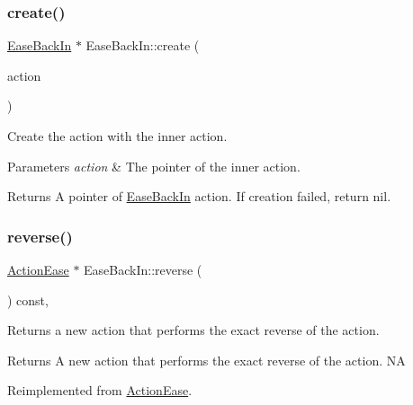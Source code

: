 \subsubsection{\texorpdfstring{create()}{create()}}
{\footnotesize\ttfamily \hyperlink{classEaseBackIn}{Ease\+Back\+In} $\ast$ Ease\+Back\+In\+::create (\begin{DoxyParamCaption}\item[{\hyperlink{classActionInterval}{Action\+Interval} $\ast$}]{action }\end{DoxyParamCaption})\hspace{0.3cm}{\ttfamily [static]}}



Create the action with the inner action. 


\begin{DoxyParams}{Parameters}
{\em action} & The pointer of the inner action. \\
\hline
\end{DoxyParams}
\begin{DoxyReturn}{Returns}
A pointer of \hyperlink{classEaseBackIn}{Ease\+Back\+In} action. If creation failed, return nil. 
\end{DoxyReturn}
\mbox{\label{classEaseBackIn_a79ac3292fef1c39370c668b99372b256}} 
\subsubsection{\texorpdfstring{reverse()}{reverse()}}
{\footnotesize\ttfamily \hyperlink{classActionEase}{Action\+Ease} $\ast$ Ease\+Back\+In\+::reverse (\begin{DoxyParamCaption}\item[{void}]{ }\end{DoxyParamCaption}) const\hspace{0.3cm}{\ttfamily [override]}, {\ttfamily [virtual]}}

Returns a new action that performs the exact reverse of the action.

\begin{DoxyReturn}{Returns}
A new action that performs the exact reverse of the action.  NA 
\end{DoxyReturn}


Reimplemented from \hyperlink{classActionEase_ab99eb083fa033fae1d6c948fdc730782}{Action\+Ease}.

